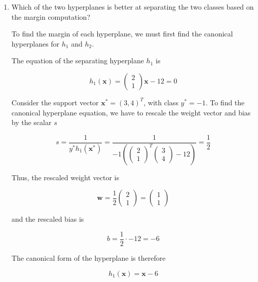 \documentclass[11pt]{article}
\begin{document}
\begin{enumerate}
\begin{enumerate}
\item Which of the two hyperplanes is better at separating the two classes based on the margin computation?

To find the margin of each hyperplane, we must first find the canonical hyperplanes for $h_1$ and $h_2$.

The equation of the separating hyperplane $h_1$ is

\begin{equation*}
h_1(\mathbf{x}) = \left( \begin{array}{c} 2 \\ 1 \end{array} \right) \mathbf{x} - 12 = 0
\end{equation*}

Consider the support vector $\mathbf{x}^* = (3,4)^\mathit{T}$, with class $y^* = -1$. To find the canonical hyperplane equation, we have to rescale the weight vector and bias by the scalar $s$

\begin{equation*}
s = \frac{1}{y^*h_1(\mathbf{x}^*)} = \frac{1}{-1\left(
\left(
\begin{array}{c}
2 \\ 1
\end{array}
\right)^\mathit{T}
\left(
\begin{array}{c}
3 \\ 4
\end{array}
\right) - 12 \right)}
=
\frac{1}{2}
\end{equation*}

Thus, the rescaled weight vector is

\begin{equation*}
\mathbf{w} = \frac{1}{2}
\left(
\begin{array}{c}
2 \\ 1
\end{array}
\right)
=
\left(
\begin{array}{c}
1 \\ 1
\end{array}
\right)
\end{equation*}

and the rescaled bias is

\begin{equation*}
b = \frac{1}{2} \cdot -12 = -6
\end{equation*}

The canonical form of the hyperplane is therefore

\begin{equation*}
h_1(\mathbf{x}) = \mathbf{x} - 6
\end{equation*}


\end{enumerate}
\end{enumerate}
\end{document}
